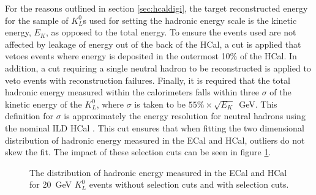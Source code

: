 For the reasons outlined in section \ref{sec:hcaldigi}, the target reconstructed energy for the sample of $K^{0}_{L}$s used for setting the hadronic energy scale is the kinetic energy, $E_{K}$, as opposed to the total energy.  To ensure the events used are not affected by leakage of energy out of the back of the HCal, a cut is applied that vetoes events where energy is deposited in the outermost 10\% of the HCal.  In addition, a cut requiring a single neutral hadron to be reconstructed is applied to veto events with reconstruction failures.  Finally, it is required that the total hadronic energy measured within the calorimeters falls within three $\sigma$ of the kinetic energy of the $K^{0}_{L}$, where $\sigma$ is taken to be $55\% \times \sqrt{E_{K}}$~GeV.  This definition for $\sigma$ is approximately the energy resolution for neutral hadrons using the nominal ILD HCal \cite{Behnke:2013lya}.  This cut ensures that when fitting the two dimensional distribution of hadronic energy measured in the ECal and HCal, outliers do not skew the fit.   The impact of these selection cuts can be seen in figure \ref{fig:hadscaleselection}.

\begin{figure}[h!]
\caption[The distribution of hadronic energy measured in the ECal and HCal for 20~GeV $K^{0}_{L}$ events with and without selection cuts.]{The distribution of hadronic energy measured in the ECal and HCal for 20~GeV $K^{0}_{L}$ events \protect{} without selection cuts and \protect{} with selection cuts.}
\label{fig:hadscaleselection}
\end{figure}

